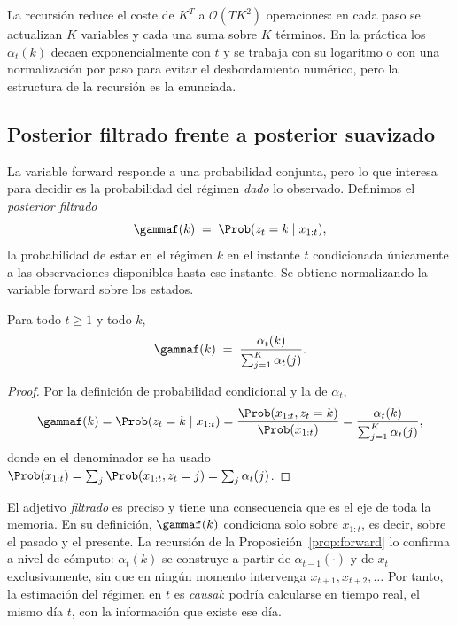 La recursión reduce el coste de $K^T$ a $\mathcal{O}(T K^2)$ operaciones: en cada paso se actualizan $K$ variables y cada una suma sobre $K$ términos. En la práctica los $\alpha_t(k)$ decaen exponencialmente con $t$ y se trabaja con su logaritmo o con una normalización por paso para evitar el desbordamiento numérico, pero la estructura de la recursión es la enunciada.

\subsection{Posterior filtrado frente a posterior suavizado}
\label{sec:hmm-filtrado}

La variable forward responde a una probabilidad conjunta, pero lo que interesa para decidir es la probabilidad del régimen \emph{dado} lo observado. Definimos el \emph{posterior filtrado}
\[
\gammaf(k) \;=\; \Prob(z_t = k \mid x_{1:t}),
\]
la probabilidad de estar en el régimen $k$ en el instante $t$ condicionada únicamente a las observaciones disponibles hasta ese instante. Se obtiene normalizando la variable forward sobre los estados.

\begin{proposicion}
\label{prop:filtrado}
Para todo $t \ge 1$ y todo $k$,
\[
\gammaf(k) \;=\; \frac{\alpha_t(k)}{\sum_{j=1}^{K} \alpha_t(j)}.
\]
\end{proposicion}

\begin{proof}
Por la definición de probabilidad condicional y la de $\alpha_t$,
\[
\gammaf(k) = \Prob(z_t = k \mid x_{1:t})
= \frac{\Prob(x_{1:t}, z_t = k)}{\Prob(x_{1:t})}
= \frac{\alpha_t(k)}{\sum_{j=1}^{K} \alpha_t(j)},
\]
donde en el denominador se ha usado $\Prob(x_{1:t}) = \sum_j \Prob(x_{1:t}, z_t = j) = \sum_j \alpha_t(j)$.
\end{proof}

El adjetivo \emph{filtrado} es preciso y tiene una consecuencia que es el eje de toda la memoria. En su definición, $\gammaf(k)$ condiciona solo sobre $x_{1:t}$, es decir, sobre el pasado y el presente. La recursión de la Proposición~\ref{prop:forward} lo confirma a nivel de cómputo: $\alpha_t(k)$ se construye a partir de $\alpha_{t-1}(\cdot)$ y de $x_t$ exclusivamente, sin que en ningún momento intervenga $x_{t+1}, x_{t+2}, \dots$ Por tanto, la estimación del régimen en $t$ es \emph{causal}: podría calcularse en tiempo real, el mismo día $t$, con la información que existe ese día.

